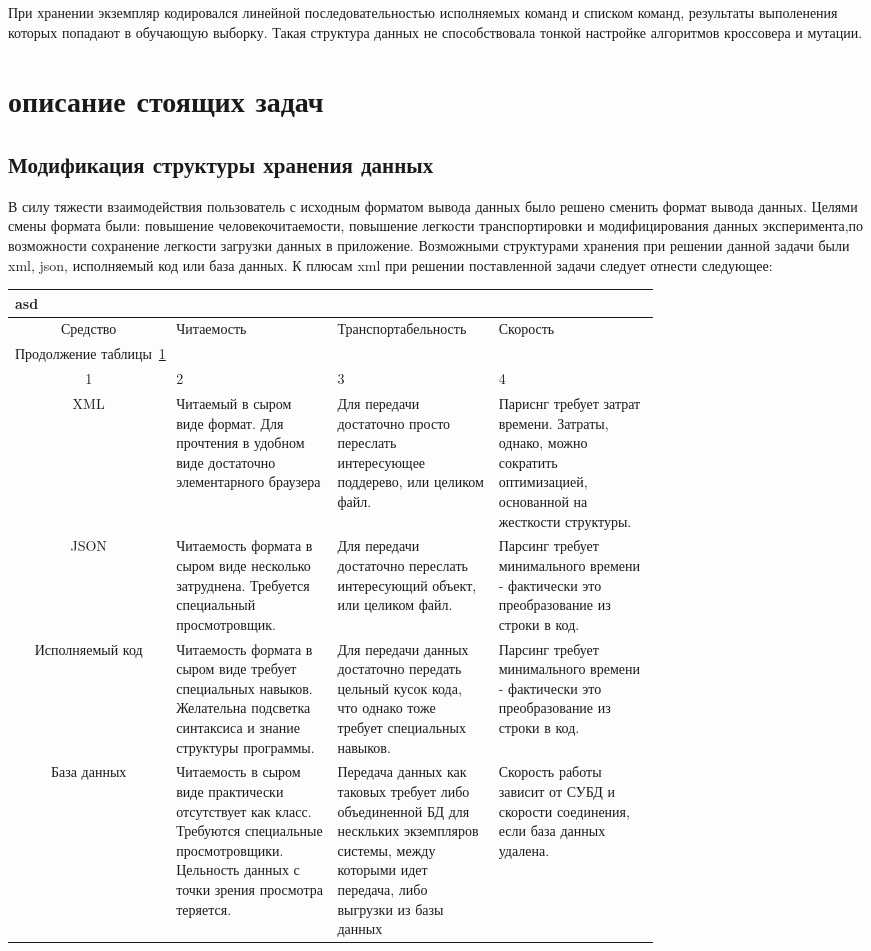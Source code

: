 \documentclass[utf8,usehyperref,12pt]{G7-32}
\begin{document}
При хранении экземпляр кодировался линейной последовательностью исполняемых команд и списком команд, результаты выполенения которых попадают в обучающую выборку. Такая структура данных не способствовала тонкой настройке алгоритмов кроссовера и мутации.
\section{описание стоящих задач}
\subsection{Модификация структуры хранения данных}
В силу тяжести взаимодействия пользователь с исходным форматом вывода данных было решено сменить формат вывода данных. Целями смены формата были: повышение человекочитаемости, повышение легкости транспортировки и модифицирования данных эксперимента,по возможности сохранение легкости загрузки данных в приложение.
Возможными структурами хранения при решении данной задачи были xml, json, исполняемый код или база данных. К плюсам xml при решении поставленной задачи следует отнести следующее:
\begin{longtable}{|c|p{0.25\linewidth}|p{0.25\linewidth}|p{0.25\linewidth}|}
\multicolumn{4}{l}{\tablename asd\label{T:Ta}}\\
\hline
Средство & Читаемость & Транспортабельность & Скорость \\
\hline
\endfirsthead
\multicolumn{4}{l}{Продолжение таблицы~\ref{T:Ta}}\\
\hline
1 & 2 & 3 & 4 \\
\hline
\endhead
XML & Читаемый в сыром виде формат. Для прочтения в удобном виде достаточно элементарного браузера & Для передачи достаточно просто переслать интересующее поддерево, или целиком файл. & Париснг требует затрат времени. Затраты, однако, можно сократить оптимизацией, основанной на жесткости структуры.   \\
JSON & Читаемость формата в сыром виде несколько затруднена. Требуется специальный просмотровщик. & Для передачи достаточно переслать интересующий объект, или целиком файл. & Парсинг требует минимального времени - фактически это преобразование из строки в код. \\
Исполняемый код & Читаемость формата в сыром виде требует специальных навыков. Желательна подсветка синтаксиса и знание структуры программы. & Для передачи данных достаточно передать цельный кусок кода, что однако тоже требует специальных навыков. & Парсинг требует минимального времени - фактически это преобразование из строки в код. \\
База данных &
Читаемость в сыром виде практически отсутствует как класс. Требуются специальные просмотровщики. Цельность данных с точки зрения просмотра теряется. &
Передача данных как таковых требует либо объединенной БД для нескльких экземпляров системы, между которыми идет передача, либо выгрузки из базы данных &
Скорость работы зависит от СУБД и скорости соединения, если база данных удалена. \\
\hline
\end{longtable}
\end{document}
